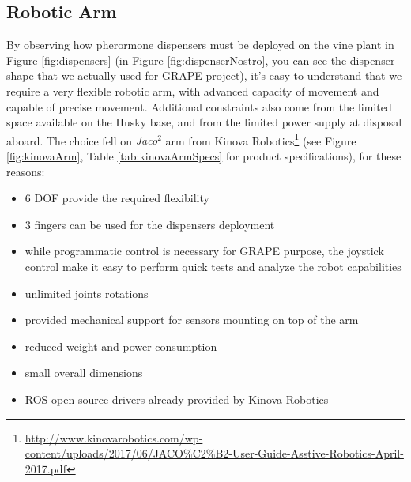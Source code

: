\subsection{Robotic Arm}\label{subsec:kinovaArm}
By observing how pherormone dispensers must be deployed on the vine plant in Figure \ref{fig:dispensers} (in Figure \ref{fig:dispenserNostro}, you can see the dispenser shape that we actually used for \ac{GRAPE} project), it's easy to understand that we require a very flexible robotic arm, with advanced capacity of movement and capable of precise movement. Additional constraints also come from the limited space available on the Husky base, and from the limited power supply at disposal aboard. The choice fell on \textit{Jaco$^2$} arm from Kinova Robotics\footnote{\url{http://www.kinovarobotics.com/wp-content/uploads/2017/06/JACO\%C2\%B2-User-Guide-Asstive-Robotics-April-2017.pdf}}
(see Figure \ref{fig:kinovaArm}, Table \ref{tab:kinovaArmSpecs} for product specifications), for these reasons:
\begin{itemize}
	\item 6 DOF provide the required flexibility
	\item 3 fingers can be used for the dispensers deployment
	\item while programmatic control is necessary for \ac{GRAPE} purpose, the joystick control make it easy to perform quick tests and analyze the robot capabilities
	\item unlimited joints rotations
	\item provided mechanical support for sensors mounting on top of the arm 
	\item reduced weight and power consumption
	\item small overall dimensions
	\item \ac{ROS} open source drivers already provided by Kinova Robotics
\end{itemize}


